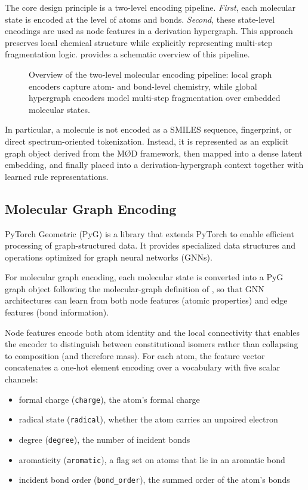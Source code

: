 The core design principle is a two-level encoding pipeline.
\emph{First}, each molecular state is encoded at the level of atoms and bonds.
\emph{Second}, these state-level encodings are used as node features in a derivation hypergraph.
This approach preserves local chemical structure while explicitly representing multi-step fragmentation logic.
 provides a schematic overview of this pipeline.

\begin{figure}[H]
    \centering
    \resizebox{0.9\textwidth}{!}{
        
    }
    \caption[Overview of the Two-Level Representation]{
        Overview of the two-level molecular encoding pipeline: local graph encoders capture atom- and bond-level chemistry, while global hypergraph encoders model multi-step fragmentation over embedded molecular states.
    }
    \label{fig:2-level-overview}
\end{figure}

In particular, a molecule is not encoded as a SMILES sequence, fingerprint, or direct spectrum-oriented tokenization.
Instead, it is represented as an explicit graph object derived from the M\O D framework, then mapped into a dense latent embedding, and finally placed into a derivation-hypergraph context together with learned rule representations.

\subsection{Molecular Graph Encoding}
\label{sec:molgraph-encoding}

PyTorch Geometric (PyG) \cite{Fey2025} is a library that extends PyTorch to enable efficient processing of graph-structured data.
It provides specialized data structures and operations optimized for graph neural networks (GNNs).

For molecular graph encoding, each molecular state is converted into a PyG graph object following the molecular-graph definition of , so that GNN architectures can learn from both node features (atomic properties) and edge features (bond information).

Node features encode both atom identity and the local connectivity that enables the encoder to distinguish between constitutional isomers rather than collapsing to composition (and therefore mass).
For each atom, the feature vector concatenates a one-hot element encoding over a vocabulary with five scalar channels:
\begin{itemize}
    \item formal charge (\texttt{charge}), the atom's formal charge
    \item radical state (\texttt{radical}), whether the atom carries an unpaired electron
    \item degree (\texttt{degree}), the number of incident bonds
    \item aromaticity (\texttt{aromatic}), a flag set on atoms that lie in an aromatic bond
    \item incident bond order (\texttt{bond\_order}), the summed order of the atom's bonds
\end{itemize}

